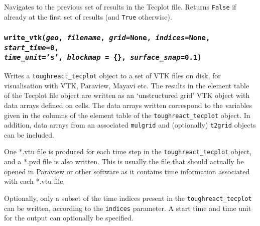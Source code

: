 Navigates to the previous set of results in the Tecplot file.  Returns \texttt{False} if already at the first set of results (and \texttt{True} otherwise).

\begin{snugshade}
\subsubsection{\texttt{write\_vtk(\emph{geo}, \emph{filename}, \emph{grid}=None, \emph{indices}=None, \emph{start\_time}=0,\\
    \emph{time\_unit}='s', \emph{blockmap} = \{\}, \emph{surface\_snap}=0.1)}}
\end{snugshade}
\label{sec:toughreact_tecplot:write_vtk}

Writes a \texttt{toughreact\_tecplot} object to a set of VTK files on disk, for visualisation with VTK, Paraview, Mayavi etc.  The results in the element table of the Tecplot file object are written as an `unstructured grid' VTK object with data arrays defined on cells.  The data arrays written correspond to the variables given in the columns of the element table of the \texttt{toughreact\_tecplot} object. In addition, data arrays from an associated \texttt{mulgrid} and (optionally) \texttt{t2grid} objects can be included.

One *.vtu file is produced for each time step in the \texttt{toughreact\_tecplot} object, and a *.pvd file is also written.  This is usually the file that should actually be opened in Paraview or other software as it contains time information associated with each *.vtu file.

Optionally, only a subset of the time indices present in the \texttt{toughreact\_tecplot} can be written, according to the \texttt{indices} parameter.  A start time and time unit for the output can optionally be specified.

